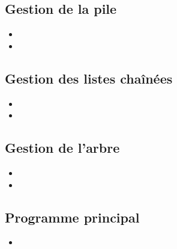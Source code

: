\subsection{Gestion de la pile}
  \begin{itemize}[noitemsep,nolistsep]
	\item {}
	\item {}
  \end{itemize}

\subsection{Gestion des listes chaînées}
  \begin{itemize}[noitemsep,nolistsep]
    \item {}
    \item {}
  \end{itemize}

\subsection{Gestion de l'arbre}
  \begin{itemize}[noitemsep,nolistsep]
    \item {}
    \item {}
  \end{itemize}
  
\subsection{Programme principal}
  \begin{itemize}[noitemsep,nolistsep]
    \item {}
  \end{itemize}
